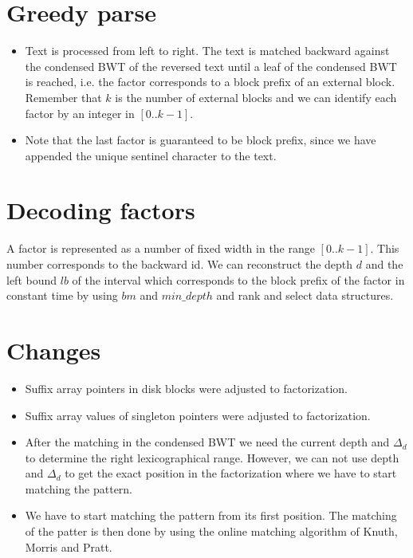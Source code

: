 \documentclass{article}
\begin{document}
\section{Greedy parse}

\begin{itemize}
	\item Text is processed from left to right. The
	      text is matched backward against the condensed BWT
		  of the reversed text until a leaf of the
		  condensed BWT is reached, i.e. the factor corresponds 
		  to a block prefix of an external block. Remember that $k$ is the
		  number of external blocks and we can identify
		  each factor by an integer in $[0..k-1]$. 
	\item Note that the last factor is guaranteed to be block
	      prefix, since we have appended the unique sentinel character
		  to the text.	
\end{itemize}

\section{Decoding factors}
A factor is represented as a number of fixed width in the range
$[0..k-1]$. This number corresponds to the backward id. We can
reconstruct the depth $d$ and the left bound $lb$ of the interval
which corresponds to the block prefix of the factor in constant time
by using $bm$ and $min\_depth$ and rank and select data structures.

\section{Changes}

\begin{itemize}
	\item Suffix array pointers in disk blocks were adjusted to
	      factorization. 
	\item Suffix array values of singleton pointers were adjusted to
		  factorization.
	\item After the matching in the condensed BWT we need the current
	      depth and $\Delta_d$ to determine the right lexicographical
		  range. However, we can not use depth and $\Delta_d$ to get
		  the exact position in the factorization where we have to
		  start matching the pattern.
	\item We have to start matching the pattern from its first position.
	      The matching of the patter is then done by using the
		  online matching algorithm of Knuth, Morris and Pratt.
		  
\end{itemize}
\end{document}
